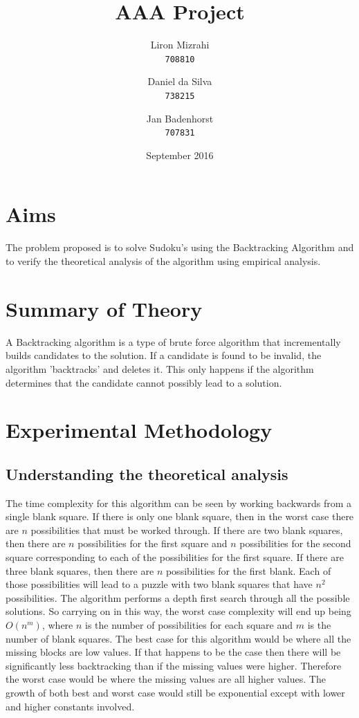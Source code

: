 \documentclass{article}
\title{AAA Project}
\date{September 2016}
\author{
  Liron Mizrahi\\
  \texttt{708810}
  \and
  Daniel da Silva\\
  \texttt{738215}
  \and
  Jan Badenhorst\\
  \texttt{707831}
}
\begin{document}
\maketitle

\section{Aims}
The problem proposed is to solve Sudoku's using the Backtracking Algorithm and to verify the theoretical analysis of the algorithm using empirical analysis.

\section{Summary of Theory}
A Backtracking algorithm is a type of brute force algorithm that incrementally builds candidates to the solution. If a candidate is found to be invalid, the algorithm 'backtracks' and deletes it. This only happens if the algorithm determines that the candidate cannot possibly lead to a solution.

\section{Experimental Methodology}
\subsection{Understanding the theoretical analysis}
The time complexity for this algorithm can be seen by working backwards from a single blank square. If there is only one blank square, then in the worst case there are $n$ possibilities that must be worked through. If there are two blank squares, then there are $n$ possibilities for the first square and $n$ possibilities for the second square corresponding to each of the possibilities for the first square. If there are three blank squares, then there are $n$ possibilities for the first blank. Each of those possibilities will lead to a puzzle with two blank squares that have $n^2$ possibilities.
The algorithm performs a depth first search through all the possible solutions. So carrying on in this way, the worst case complexity will end up being $O(n^m)$, where $n$ is the number of possibilities for each square and $m$ is the number of blank squares.
The best case for this algorithm would be where all the missing blocks are low values. If that happens to be the case then there will be significantly less backtracking than if the missing values were higher. Therefore the worst case would be where the missing values are all higher values. The growth of both best and worst case would still be exponential except with lower and higher constants involved.
\end{document}
